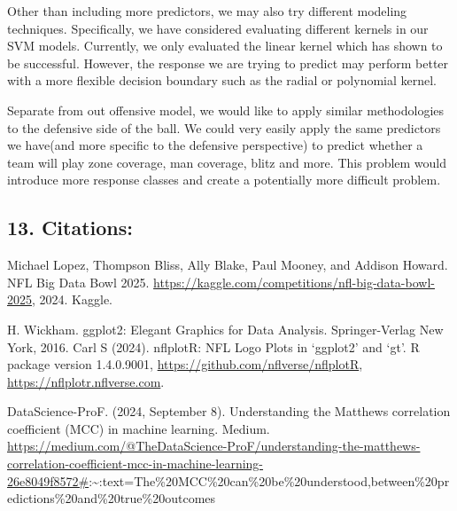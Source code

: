 \documentclass[
]{article}
\begin{document}
Other than including more predictors, we may also try different modeling
techniques. Specifically, we have considered evaluating different
kernels in our SVM models. Currently, we only evaluated the linear
kernel which has shown to be successful. However, the response we are
trying to predict may perform better with a more flexible decision
boundary such as the radial or polynomial kernel.

Separate from out offensive model, we would like to apply similar
methodologies to the defensive side of the ball. We could very easily
apply the same predictors we have(and more specific to the defensive
perspective) to predict whether a team will play zone coverage, man
coverage, blitz and more. This problem would introduce more response
classes and create a potentially more difficult problem.

\subsection{13. Citations:}\label{citations}

Michael Lopez, Thompson Bliss, Ally Blake, Paul Mooney, and Addison
Howard. NFL Big Data Bowl 2025.
\url{https://kaggle.com/competitions/nfl-big-data-bowl-2025}, 2024.
Kaggle.

H. Wickham. ggplot2: Elegant Graphics for Data Analysis. Springer-Verlag
New York, 2016. Carl S (2024). nflplotR: NFL Logo Plots in `ggplot2' and
`gt'. R package version 1.4.0.9001,
\url{https://github.com/nflverse/nflplotR},
\url{https://nflplotr.nflverse.com}.

DataScience-ProF. (2024, September 8). Understanding the Matthews
correlation coefficient (MCC) in machine learning. Medium.
\url{https://medium.com/@TheDataScience-ProF/understanding-the-matthews-correlation-coefficient-mcc-in-machine-learning-26e8049f8572\#}:\textasciitilde:text=The\%20MCC\%20can\%20be\%20understood,between\%20predictions\%20and\%20true\%20outcomes
\end{document}
